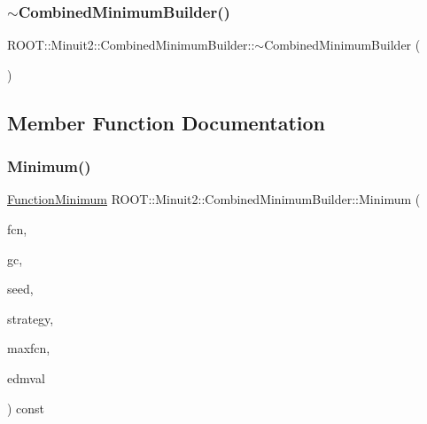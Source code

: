 \mbox{\label{classROOT_1_1Minuit2_1_1CombinedMinimumBuilder_a50159966d74446223a77e638aad1dd44}} 
\subsubsection{\texorpdfstring{$\sim$CombinedMinimumBuilder()}{~CombinedMinimumBuilder()}\hspace{0.1cm}{\footnotesize\ttfamily [2/2]}}
{\footnotesize\ttfamily R\+O\+O\+T\+::\+Minuit2\+::\+Combined\+Minimum\+Builder\+::$\sim$\+Combined\+Minimum\+Builder (\begin{DoxyParamCaption}{ }\end{DoxyParamCaption})\hspace{0.3cm}{\ttfamily [inline]}}



\subsection{Member Function Documentation}
\mbox{\label{classROOT_1_1Minuit2_1_1CombinedMinimumBuilder_a44282b6271b536b7fc6b80af16ac67ef}} 
\subsubsection{\texorpdfstring{Minimum()}{Minimum()}\hspace{0.1cm}{\footnotesize\ttfamily [1/2]}}
{\footnotesize\ttfamily \mbox{\hyperlink{classROOT_1_1Minuit2_1_1FunctionMinimum}{Function\+Minimum}} R\+O\+O\+T\+::\+Minuit2\+::\+Combined\+Minimum\+Builder\+::\+Minimum (\begin{DoxyParamCaption}\item[{const \mbox{\hyperlink{classROOT_1_1Minuit2_1_1MnFcn}{Mn\+Fcn}} \&}]{fcn,  }\item[{const \mbox{\hyperlink{classROOT_1_1Minuit2_1_1GradientCalculator}{Gradient\+Calculator}} \&}]{gc,  }\item[{const \mbox{\hyperlink{classROOT_1_1Minuit2_1_1MinimumSeed}{Minimum\+Seed}} \&}]{seed,  }\item[{const \mbox{\hyperlink{classROOT_1_1Minuit2_1_1MnStrategy}{Mn\+Strategy}} \&}]{strategy,  }\item[{unsigned int}]{maxfcn,  }\item[{double}]{edmval }\end{DoxyParamCaption}) const\hspace{0.3cm}{\ttfamily [virtual]}}



